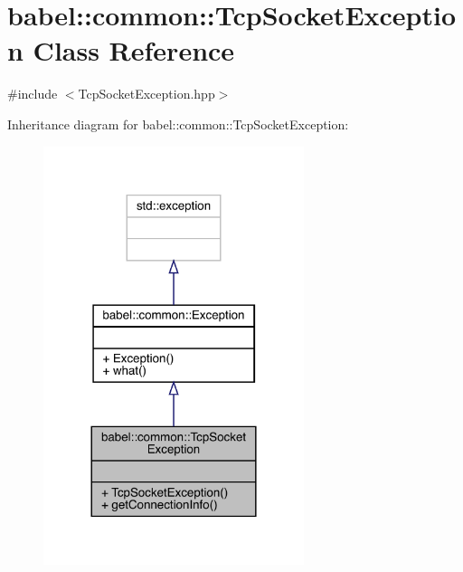 \hypertarget{classbabel_1_1common_1_1_tcp_socket_exception}{}\section{babel\+:\+:common\+:\+:Tcp\+Socket\+Exception Class Reference}
\label{classbabel_1_1common_1_1_tcp_socket_exception}


{\ttfamily \#include $<$Tcp\+Socket\+Exception.\+hpp$>$}



Inheritance diagram for babel\+:\+:common\+:\+:Tcp\+Socket\+Exception\+:\nopagebreak
\begin{figure}[H]
\begin{center}
\leavevmode
\includegraphics[width=216pt]{classbabel_1_1common_1_1_tcp_socket_exception__inherit__graph}
\end{center}
\end{figure}


